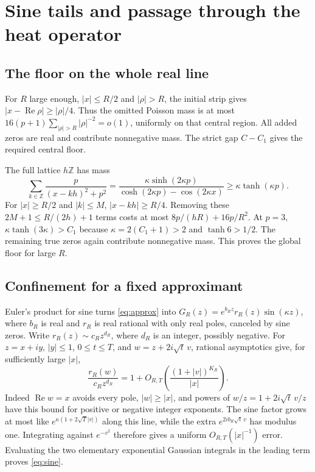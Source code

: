 \documentclass[11pt]{article}
\theoremstyle{remark}\newtheorem{remark}[theorem]{Remark}
\newcommand{\Rea}{\operatorname{Re}}
\begin{document}
\section{Sine tails and passage through the heat operator}\label{app:heat}

\subsection{The floor on the whole real line}
For $R$ large enough, $|x|\le R/2$ and $|\rho|>R$, the initial strip
gives $|x-\Rea\rho|\ge|\rho|/4$. Thus the omitted Poisson mass is
at most $16(p+1)\sum_{|\rho|>R}|\rho|^{-2}=o(1)$, uniformly on that
central region. All added zeros are real and contribute nonnegative
mass. The strict gap $C-C_1$ gives the required central floor.

The full lattice $h\mathbb Z$ has mass
\[
 \sum_{k\in\mathbb Z}\frac{p}{(x-kh)^2+p^2}
 =\frac{\kappa\sinh(2\kappa p)}
        {\cosh(2\kappa p)-\cos(2\kappa x)}
 \ge\kappa\tanh(\kappa p).
\]
For $|x|\ge R/2$ and $|k|\le M$, $|x-kh|\ge R/4$.
Removing these $2M+1\le R/(2h)+1$ terms costs at most
$8p/(hR)+16p/R^2$. At $p=3$,
$\kappa\tanh(3\kappa)>C_1$ because $\kappa=2(C_1+1)>2$ and
$\tanh6>1/2$. The remaining true zeros again contribute nonnegative
mass. This proves the global floor for large $R$.

\subsection{Confinement for a fixed approximant}
Euler's product for sine turns \eqref{eq:approx} into
$G_R(z)=e^{b_Rz}r_R(z)\sin(\kappa z)$, where $b_R$ is real and
$r_R$ is real rational with only real poles, canceled by sine zeros.
Write $r_R(z)\sim c_Rz^{d_R}$, where $d_R$ is an integer, possibly
negative. For $z=x+iy$, $|y|\le1$, $0\le t\le T$, and
$w=z+2i\sqrt t\,v$, rational asymptotics give, for sufficiently large
$|x|$,
\[
 \frac{r_R(w)}{c_Rz^{d_R}}
 =1+O_{R,T}\left(\frac{(1+|v|)^{K_R}}{|x|}\right).
\]
Indeed $\Rea w=x$ avoids every pole, $|w|\ge|x|$, and powers of
$w/z=1+2i\sqrt t\,v/z$ have this bound for positive or negative
integer exponents. The sine factor grows at most like
$e^{\kappa(1+2\sqrt T|v|)}$ along this line, while the extra
$e^{2ib_R\sqrt t\,v}$ has modulus one. Integrating against $e^{-v^2}$
therefore gives a uniform $O_{R,T}(|x|^{-1})$ error. Evaluating the
two elementary exponential Gaussian integrals in the leading term
proves \eqref{eq:sine}.
\end{document}
